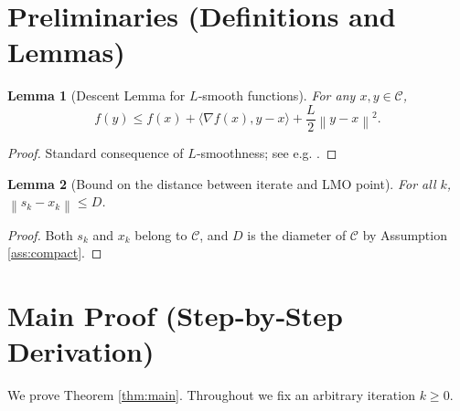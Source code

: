 \documentclass{article}
\newtheorem{lemma}{Lemma}
\newcommand{\norm}[1]{\left\lVert #1\right\rVert}
\newcommand{\ip}[2]{\langle #1,#2\rangle}
\begin{document}
\section*{Preliminaries (Definitions and Lemmas)}
\begin{lemma}[Descent Lemma for $L$‑smooth functions]\label{lem:descent}
For any $x,y\in\mathcal C$,
\[
f(y) \le f(x) + \ip{\nabla f(x)}{y-x} + \frac{L}{2}\norm{y-x}^2 .
\]
\end{lemma}
\begin{proof}
Standard consequence of $L$‑smoothness; see e.g. \cite{Nesterov2004}. \qedhere
\end{proof}

\begin{lemma}[Bound on the distance between iterate and LMO point]\label{lem:diam}
For all $k$, $\norm{s_k-x_k}\le D$.
\end{lemma}
\begin{proof}
Both $s_k$ and $x_k$ belong to $\mathcal C$, and $D$ is the diameter of $\mathcal C$ by Assumption \ref{ass:compact}. \qedhere
\end{proof}

\section*{Main Proof (Step‑by‑Step Derivation)}
We prove Theorem \ref{thm:main}. Throughout we fix an arbitrary iteration $k\ge0$.
\end{document}

